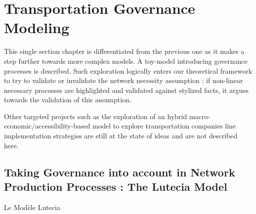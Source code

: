 




\chapter{Transportation Governance Modeling} %

\label{ch:lutetia} %



This single section chapter is differentiated from the previous one as it makes a step further towards more complex models. A toy-model introducing governance processes is described. Such exploration logically enters our theoretical framework to try to validate or invalidate the network necessity assumption : if non-linear necessary processes are highlighted and validated against stylized facts, it argues towards the validation of this assumption. 

Other targeted projects such as the exploration of an hybrid macro-economic/accessibility-based model to explore transportation companies line implementation strategies are still at the state of ideas and are not described here.





\section[The Lutecia Model]{Taking Governance into account in Network Production Processes : The Lutecia Model}{Le Modèle Lutecia}









